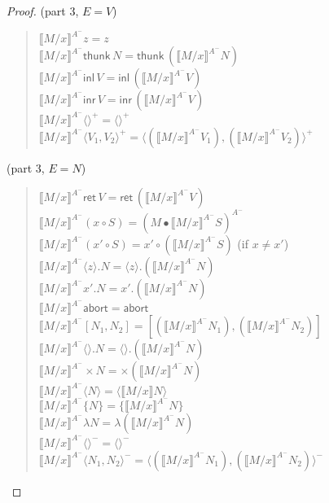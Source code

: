 \documentclass[acmtocl]{robtrans}\pdfoutput=1
\newcommand{\susp}[1]{\langle{#1}\rangle}
\newcommand{\dsrt}[1]{\mathsf{thunk}\,{#1}}
\newcommand{\dslt}[2]{{#1}.{#2}}      \newcommand{\usrt}[1]{\{{#1}\}}       \newcommand{\uslt}[1]{\mathsf{pm}\,{#1}}
\newcommand{\etart}[1]{\langle{#1}\rangle} \newcommand{\etalt}[2]{\susp{#1}.{#2}}
\newcommand{\rft}[1]{\mathsf{ret}\,{#1}} \newcommand{\lft}[2]{{#1} \circ {#2}}
\begin{document}
\begin{proof}
\bigskip
{} (part 3, $E = V$)
\begin{quote}
$\llbracket M/x \rrbracket^{A^-} z = z$\\
$\llbracket M/x \rrbracket^{A^-} \dsrt{N} 
   = \dsrt{(\llbracket M/x \rrbracket^{A^-} N)}$\\
$\llbracket M/x \rrbracket^{A^-} \mathsf{inl}\,V 
   = \mathsf{inl}\,(\llbracket M/x \rrbracket^{A^-} V)$\\
$\llbracket M/x \rrbracket^{A^-} \mathsf{inr}\,V 
   = \mathsf{inr}\,(\llbracket M/x \rrbracket^{A^-} V)$\\
$\llbracket M/x \rrbracket^{A^-} \langle\rangle^+ = \langle\rangle^+$\\
$\llbracket M/x \rrbracket^{A^-} \langle V_1, V_2 \rangle^+ 
   = \langle (\llbracket M/x \rrbracket^{A^-}V_1), 
             (\llbracket M/x \rrbracket^{A^-}V_2) \rangle^+$
\end{quote}

\medskip
{} (part 3, $E=N$)
\begin{quote}
$\llbracket M/x \rrbracket^{A^-} \rft{V}
   = \rft{(\llbracket M/x \rrbracket^{A^-} V)}$\\
$\llbracket M/x \rrbracket^{A^-} (\lft{x}{S})
   = (M \bullet \llbracket M/x \rrbracket^{A^-} S)^{A^-}$\\
$\llbracket M/x \rrbracket^{A^-} (\lft{x'}{S}) 
   = \lft{x'}{(\llbracket M/x \rrbracket^{A^-} S)}$
   \qquad (if $x \neq x'$)\\
$\llbracket M/x \rrbracket^{A^-} \etalt{z}{N} 
   = \etalt{z}{(\llbracket M/x \rrbracket^{A^-} N)}$\\
$\llbracket M/x \rrbracket^{A^-} \dslt{x'}{N} 
   = \dslt{x'}{(\llbracket M/x \rrbracket^{A^-} N)}$\\
$\llbracket M/x \rrbracket^{A^-} \mathsf{abort}
   = \mathsf{abort}$\\
$\llbracket M/x \rrbracket^{A^-} [N_1, N_2] 
   = [(\llbracket M/x \rrbracket^{A^-} N_1),
      (\llbracket M/x \rrbracket^{A^-} N_2)]$\\
$\llbracket M/x \rrbracket^{A^-} \langle\rangle.N
   = \langle\rangle.(\llbracket M/x \rrbracket^{A^-} N)$\\
$\llbracket M/x \rrbracket^{A^-} {\times}N 
   = {\times}(\llbracket M/x \rrbracket^{A^-} N)$\\
$\llbracket M/x \rrbracket^{A^-} \etart{N} 
   = \etart{\llbracket M/x \rrbracket N}$\\
$\llbracket M/x \rrbracket^{A^-} \usrt{N} 
   = \usrt{\llbracket M/x \rrbracket^{A^-} N}$\\
$\llbracket M/x \rrbracket^{A^-} \lambda N 
   = \lambda (\llbracket M/x \rrbracket^{A^-} N)$\\
$\llbracket M/x \rrbracket^{A^-} \langle\rangle^- = \langle\rangle^-$\\
$\llbracket M/x \rrbracket^{A^-} \langle N_1, N_2 \rangle^- 
   = \langle (\llbracket M/x \rrbracket^{A^-} N_1),
             (\llbracket M/x \rrbracket^{A^-} N_2) \rangle^-$


\end{quote}
\end{proof}
\end{document}
